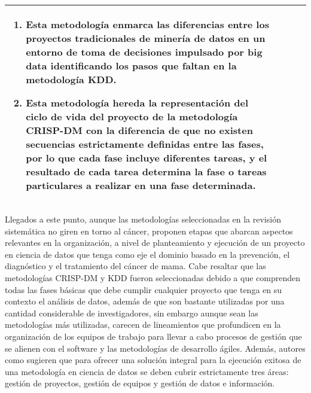 \begin{table*}[!htb]
\begin{threeparttable}
\begin{tabular}{p{1cm} p{2cm} p{5cm} p{6.5cm}}
\begin{enumerate}
				\item Esta metodología enmarca las diferencias entre los proyectos tradicionales de minería de datos en un entorno de toma de decisiones impulsado por big data identificando los pasos que faltan en la metodología KDD.
				\item Esta metodología hereda la representación del ciclo de vida del proyecto de la metodología CRISP-DM con la diferencia de que no existen  secuencias estrictamente definidas entre las fases, por lo que cada fase incluye diferentes tareas, y el resultado de cada tarea determina la fase o tareas particulares a realizar en una fase determinada. 
			\end{enumerate}
			\\ \hline
		\end{tabular}
	\end{threeparttable}
\end{table*}

\clearpage
Llegados a este punto, aunque las metodologías seleccionadas en la revisión sistemática no giren en torno al cáncer, proponen etapas que abarcan aspectos relevantes en la organización, a nivel de planteamiento y ejecución de un proyecto en ciencia de datos que tenga como eje el dominio basado en la prevención, el diagnóstico y el tratamiento del cáncer de mama. Cabe resaltar que las metodologías CRISP-DM y KDD fueron seleccionadas debido a que comprenden todas las fases básicas que debe cumplir cualquier proyecto que tenga en su contexto el análisis de datos, además de que son bastante utilizadas por una cantidad considerable de investigadores, sin embargo aunque sean las metodologías más utilizadas, carecen de lineamientos que profundicen en la organización de los equipos de trabajo para llevar a cabo procesos de gestión que se alienen con el software y las metodologías de desarrollo ágiles. Además, autores como \cite{Martinez2021} sugieren que para ofrecer una solución integral para la ejecución exitosa de una metodología en ciencia de datos se deben cubrir estrictamente tres áreas: gestión de proyectos, gestión de equipos y gestión de datos e información. 

